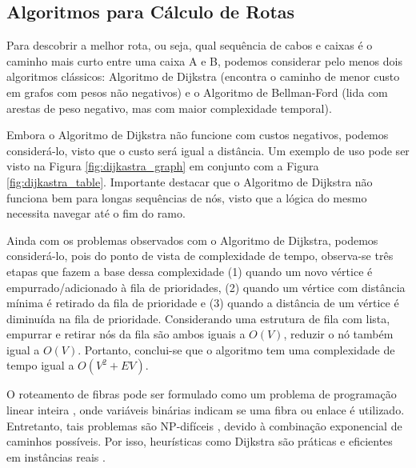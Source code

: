 \subsection{Algoritmos para Cálculo de Rotas}

Para descobrir a melhor rota, ou seja, qual sequência de cabos e caixas é o
caminho mais curto entre uma caixa A e B, podemos considerar pelo menos dois
algoritmos clássicos: Algoritmo de Dijkstra (encontra o caminho de menor custo
em grafos com pesos não negativos) \cite{dijkstra2022note} e o Algoritmo de
Bellman-Ford (lida com arestas de peso negativo, mas com maior complexidade
temporal).

Embora o Algoritmo de Dijkstra não funcione com custos negativos, podemos
considerá-lo, visto que o custo será igual a distância. Um exemplo de uso pode
ser visto na Figura \ref{fig:dijkastra_graph} em conjunto com a Figura
\ref{fig:dijkastra_table}. Importante destacar que o Algoritmo de Dijkstra não
funciona bem para longas sequências de nós, visto que a lógica do mesmo
necessita navegar até o fim do ramo.

Ainda com os problemas observados com o Algoritmo de Dijkstra, podemos
considerá-lo, pois do ponto de vista de complexidade de tempo, observa-se três
etapas que fazem a base dessa complexidade (1) quando um novo vértice é
empurrado/adicionado à fila de prioridades, (2) quando um vértice com distância
mínima é retirado da fila de prioridade e (3) quando a distância de um vértice
é diminuída na fila de prioridade. Considerando uma estrutura de fila com
lista, empurrar e retirar nós da fila são ambos iguais a $O(V)$, reduzir o nó
também igual a $O(V)$. Portanto, conclui-se que o algoritmo tem uma
complexidade de tempo igual a $O(V^2 + EV)$.

O roteamento de fibras pode ser formulado como um problema de programação
linear inteira \cite{griva2008linear}, onde variáveis binárias indicam se uma
fibra ou enlace é utilizado. Entretanto, tais problemas são NP-difíceis
\cite{artigorwa}, devido à combinação exponencial de caminhos possíveis. Por
isso, heurísticas como Dijkstra são práticas e eficientes em instâncias reais
\cite{mukherjee2020springer}.

